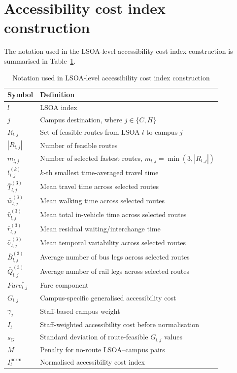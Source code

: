 \documentclass[11pt,a4paper]{article}
\begin{document}
\section{Accessibility cost index construction}

The notation used in the LSOA-level accessibility cost index construction is summarised in Table~\ref{tab:index_notation}.

\begin{table}[H]
\centering
\small
\caption{Notation used in LSOA-level accessibility cost index construction}
\label{tab:index_notation}
\renewcommand{\arraystretch}{1.35}
\begin{tabular}{ll}
\hline
Symbol & Definition \\
\hline
$l$ & LSOA index \\
$j$ & Campus destination, where $j \in \{C,H\}$ \\
$R_{l,j}$ & Set of feasible routes from LSOA $l$ to campus $j$ \\
$|R_{l,j}|$ & Number of feasible routes \\
$m_{l,j}$ & Number of selected fastest routes, $m_{l,j}=\min(3,|R_{l,j}|)$ \\
$t_{l,j}^{(k)}$ & $k$-th smallest time-averaged travel time \\
$\bar{T}^{(3)}_{l,j}$ & Mean travel time across selected routes \\
$\bar{w}^{(3)}_{l,j}$ & Mean walking time across selected routes \\
$\bar{v}^{(3)}_{l,j}$ & Mean total in-vehicle time across selected routes \\
$\bar{r}^{(3)}_{l,j}$ & Mean residual waiting/interchange time \\
$\bar{\sigma}^{(3)}_{l,j}$ & Mean temporal variability across selected routes \\
$\bar{B}^{(3)}_{l,j}$ & Average number of bus legs across selected routes \\
$\bar{Q}^{(3)}_{l,j}$ & Average number of rail legs across selected routes \\
$Fare^*_{l,j}$ & Fare component \\
$G_{l,j}$ & Campus-specific generalised accessibility cost \\
$\gamma_j$ & Staff-based campus weight \\
$I_l$ & Staff-weighted accessibility cost before normalisation \\
$s_G$ & Standard deviation of route-feasible $G_{l,j}$ values \\
$M$ & Penalty for no-route LSOA--campus pairs \\
$I_l^{\text{norm}}$ & Normalised accessibility cost index \\
\hline
\end{tabular}
\renewcommand{\arraystretch}{1}
\end{table}
\end{document}
